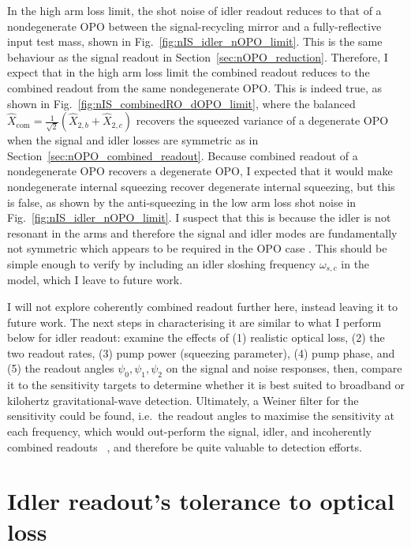 In the high arm loss limit, the shot noise of idler readout reduces to that of a nondegenerate OPO between the signal-recycling mirror and a fully-reflective input test mass, shown in Fig.~\ref{fig:nIS_idler_nOPO_limit}. This is the same behaviour as the signal readout in Section~\ref{sec:nOPO_reduction}. 
Therefore, I expect that in the high arm loss limit the combined readout reduces to the combined readout from the same nondegenerate OPO. This is indeed true, as shown in Fig.~\ref{fig:nIS_combinedRO_dOPO_limit}, where the balanced $\hat X_\text{com}=\frac{1}{\sqrt2}\left(\hat X_{2,b}+\hat X_{2,c}\right)$  recovers the squeezed variance of a degenerate OPO when the signal and idler losses are symmetric  as in Section~\ref{sec:nOPO_combined_readout}.
Because combined readout of a nondegenerate OPO recovers a degenerate OPO, I expected that it would make nondegenerate internal squeezing recover degenerate internal squeezing, but this is false, as shown by the anti-squeezing in the low arm loss shot noise in Fig.~\ref{fig:nIS_idler_nOPO_limit}. I suspect that this is because the idler is not resonant in the arms and therefore the signal and idler modes are fundamentally not symmetric which appears to be required in the OPO case . This should be simple enough to verify by including an idler sloshing frequency $\omega_{s,c}$ in the model, which I leave to future work.

I will not explore coherently combined readout further here, instead leaving it to future work. The next steps in characterising it are similar to what I perform below for idler readout: examine the effects of (1) realistic optical loss, (2) the two readout rates, (3) pump power (squeezing parameter), (4) pump phase, and (5) the readout angles $\psi_0,\psi_1,\psi_2$ on the signal and noise responses, then, compare it to the sensitivity targets to determine whether it is best suited to broadband or kilohertz gravitational-wave detection. Ultimately, a Weiner filter for the sensitivity could be found, i.e.\ the readout angles to maximise the sensitivity at each frequency, which would out-perform the signal, idler, and incoherently combined readouts ~\cite{}, and therefore be quite valuable  to detection efforts.


\section{Idler readout's tolerance to optical loss}

